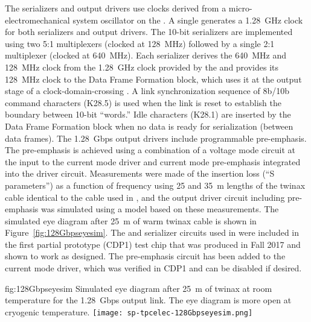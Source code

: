 The serializers and output drivers use clocks derived from a micro-electromechanical
system oscillator on the . A single  generates a 
\SI{1.28}{GHz} clock for both serializers and output drivers. The \num{10}-bit
serializers are implemented using two \num{5}:\num{1} multiplexers (clocked at \SI{128}{MHz}) 
followed by a single \num{2}:\num{1} multiplexer (clocked at \SI{640}{MHz}). Each serializer 
derives the \SI{640}{MHz} and \SI{128}{MHz} clock from the \SI{1.28}{GHz} 
clock provided by the  and provides its \SI{128}{MHz} clock to 
the Data Frame Formation block, which uses it at the output stage of a 
clock-domain-crossing . A link synchronization sequence of 8b/10b 
command characters (K28.5) is used when the link is reset to establish the 
boundary between \num{10}-bit ``words.'' Idle characters (K28.1) are inserted 
by the Data Frame Formation block when no data is ready for serialization 
(between data frames). The \SI{1.28}{Gbps} output drivers include programmable 
pre-emphasis. The pre-emphasis is achieved using a combination of a voltage 
mode circuit at the input to the current mode driver and current mode 
pre-emphasis integrated into the driver circuit. Measurements were made 
of the insertion loss (``S parameters'') as a function of frequency using
\num{25} and \SI{35}{m} lengths of the twinax cable identical to the 
cable used in , and the output driver circuit including 
pre-emphasis was simulated using a  model based on these 
measurements. The simulated eye diagram after \SI{25}{m} of warm twinax 
cable is shown in Figure~\ref{fig:128Gbpseyesim}. The  and 
serializer circuits used in  were included in the first partial prototype (CDP1) 
test chip that was produced in Fall 2017 and shown to work as designed. 
The pre-emphasis circuit has been added to the current mode driver, which 
was verified in CDP1 and can be disabled if desired. 

\begin{dunefigure}
{fig:128Gbpseyesim}
{Simulated eye diagram after \SI{25}{m} of  twinax at room 
temperature for the  \SI{1.28}{Gbps} output link.  
The eye diagram is more open at cryogenic temperature.}
\texttt{[image: sp-tpcelec-128Gbpseyesim.png]}
\end{dunefigure}

\label{sec:fdsp-tpcelec-design-femb-alt-cots}

